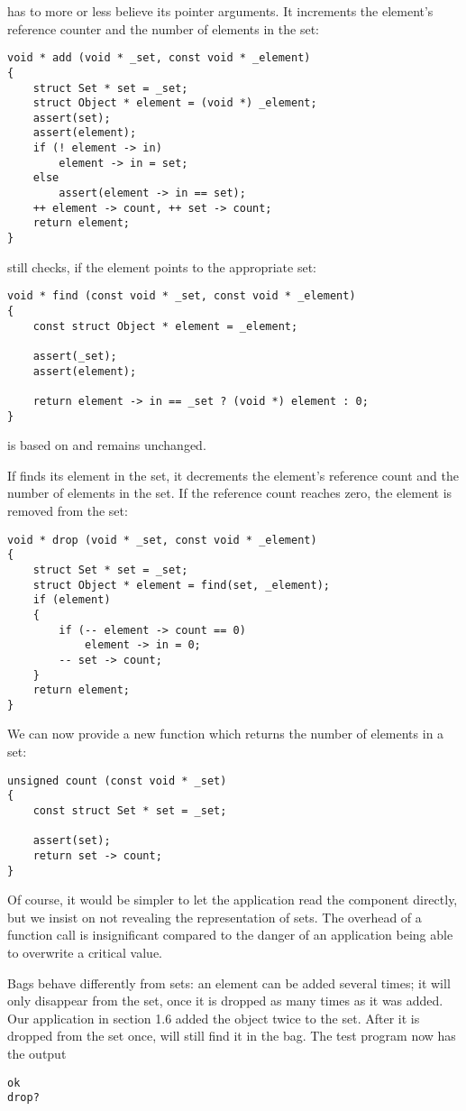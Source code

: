  has to more or less believe its pointer arguments. It
increments the element's reference counter and the number of elements in the
set:
\begin{lstlisting}
void * add (void * _set, const void * _element)
{
	struct Set * set = _set;
	struct Object * element = (void *) _element;
	assert(set);
	assert(element);
	if (! element -> in)
		element -> in = set;
	else
		assert(element -> in == set);
	++ element -> count, ++ set -> count;
	return element;
}
\end{lstlisting}
 still checks, if the element points to the appropriate set:
\begin{lstlisting}
void * find (const void * _set, const void * _element)
{
	const struct Object * element = _element;

	assert(_set);
	assert(element);

	return element -> in == _set ? (void *) element : 0;
}
\end{lstlisting}
 is based on  and remains unchanged.

If  finds its element in the set, it decrements the element's
reference count and the number of elements in the set. If the reference
count reaches zero, the element is removed from the set:
\begin{lstlisting}
void * drop (void * _set, const void * _element)
{
	struct Set * set = _set;
	struct Object * element = find(set, _element);
	if (element)
	{
		if (-- element -> count == 0)
			element -> in = 0;
		-- set -> count;
	}
	return element;
}
\end{lstlisting}

We can now provide a new function  which returns the number of
elements in a set:
\begin{lstlisting}
unsigned count (const void * _set)
{
	const struct Set * set = _set;

	assert(set);
	return set -> count;
}
\end{lstlisting}
Of course, it would be simpler to let the application read the component
 directly, but we insist on not revealing the representation of
sets. The overhead of a function call is insignificant compared to the
danger of an application being able to overwrite a critical value.

Bags behave differently from sets: an element can be added several times; it
will only disappear from the set, once it is dropped as many times as it was
added. Our application in section 1.6 added the object  twice to the
set. After it is dropped from the set once,  will still
find it in the bag. The test program now has the output
\begin{lstlisting}
ok
drop?
\end{lstlisting}

